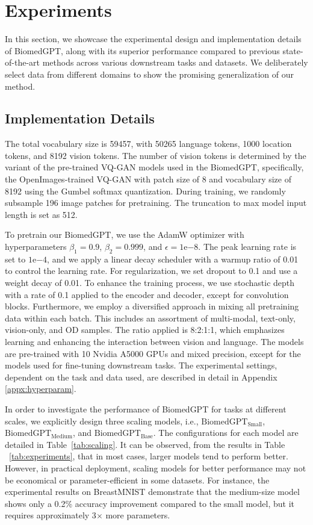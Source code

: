 \documentclass[10pt]{article} \usepackage[preprint]{tmlr}
\begin{document}
\section{Experiments}


In this section, we showcase the experimental design and implementation details of BiomedGPT, along with its superior performance compared to previous state-of-the-art methods across various downstream tasks and datasets. We deliberately select data from different domains to show the promising generalization of our method.

\subsection{Implementation Details} \label{sec:implementation}
The total vocabulary size is 59457, with 50265 language tokens, 1000 location tokens, and 8192 vision tokens. The number of vision tokens is determined by the variant of the pre-trained VQ-GAN models used in the BiomedGPT, specifically, the OpenImages\citep{kuznetsova2020open}-trained VQ-GAN with patch size of 8 and vocabulary size of 8192 using the Gumbel softmax \citep{jangcategorical2017, maddisonconcrete2017} quantization. During training, we randomly subsample 196 image patches for pretraining. The truncation to max model input length is set as 512.

To pretrain our BiomedGPT, we use the AdamW \citep{loshchilovdecoupled} optimizer with hyperparameters $\beta_1 = 0.9$, $\beta_2 = 0.999$, and $\epsilon = 1\mathrm{e}{-8}$. The peak learning rate is set to $1\mathrm{e}{-4}$, and we apply a linear decay scheduler with a warmup ratio of 0.01 to control the learning rate. For regularization, we set dropout to 0.1 and use a weight decay of 0.01. To enhance the training process, we use stochastic depth with a rate of 0.1 applied to the encoder and decoder, except for convolution blocks. Furthermore, we employ a diversified approach in mixing all pretraining data within each batch. This includes an assortment of multi-modal, text-only, vision-only, and OD samples. The ratio applied is 8:2:1:1, which emphasizes learning and enhancing the interaction between vision and language. The models are pre-trained with 10 Nvidia A5000 GPUs and mixed precision, except for the models used for fine-tuning downstream tasks. The experimental settings, dependent on the task and data used, are described in detail in Appendix \ref{appx:hyperparam}.

In order to investigate the performance of BiomedGPT for tasks at different scales, we explicitly design three scaling models, i.e., $\text{BiomedGPT}_{\text{Small}}$, $\text{BiomedGPT}_{\text{Medium}}$,
and $\text{BiomedGPT}_{\text{Base}}$. The configurations for each model are detailed in Table~\ref{tab:scaling}. It can be observed, from the results in Table ~\ref{tab:experiments}, that in most cases, larger models tend to perform better. However, in practical deployment, scaling models for better performance may not be economical or parameter-efficient in some datasets. For instance, the experimental results on BreastMNIST demonstrate that the medium-size model shows only a 0.2\% accuracy improvement compared to the small model, but it requires approximately 3$\times$ more parameters. 
\end{document}
